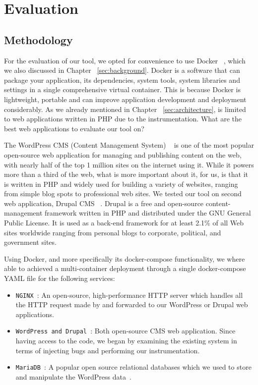\chapter{Evaluation}
\label{sec:evaluation}
\minitoc
\vspace*{1cm}

\section{Methodology}
For the evaluation of our tool, we opted for convenience to use Docker ~\cite{docker_def}, which we also discussed in Chapter ~\ref{sec:background}. Docker is a software that can package your application, its dependencies, system tools, system libraries and settings in a single comprehensive virtual container. This is because Docker is lightweight, portable and can improve application development and deployment considerably. As we already mentioned in Chapter ~\ref{sec:architecture}, \pname{} is limited to web applications written in PHP due to the instrumentation. What are the best web applications to evaluate our tool on?

The WordPress CMS (Content Management System) ~\cite{docker_def} is one of the most popular open-source web application for managing and publishing content on the web, with nearly half of the top 1 million sites on the internet using it. While it powers more than a third of the web, what is more important about it, for us, is that it is written in PHP and widely used for building a variety of websites, ranging from simple blog spots to professional web sites. We tested our tool on second web application, Drupal CMS ~\cite{drupal}. Drupal is a free and open-source content-management framework written in PHP and distributed under the GNU General Public License. It is used as a back-end framework for at least 2.1\% of all Web sites worldwide ranging from personal blogs to corporate, political, and government sites.

Using Docker, and more specifically its docker-compose functionality, we where able to achieved a multi-container deployment through a single docker-compose YAML file for the following services:

\begin{itemize}
	\item {\tt NGINX }: An open-source, high-performance HTTP server which handles all the HTTP request made by \pname{} and forwarded to our WordPress or Drupal web applications.{~\cite{nginx}}
	\item {\tt WordPress and Drupal }: Both open-source CMS web application. Since having access to the code, we began by examining the existing system in terms of injecting bugs and performing our instrumentation.
	\item {\tt MariaDB }: A popular open source relational databases which we used to store and manipulate the WordPress data~\cite{mariadb}.
\end{itemize}

